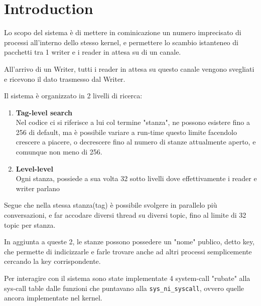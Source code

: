 \section{Introduction}

Lo scopo del sistema è di mettere in cominicazione un numero imprecisato di
processi all'interno dello stesso kernel, e permettere lo scambio istanteneo
di pacchetti tra 1 writer e i reader in attesa su di un canale.

All'arrivo di un Writer, tutti i reader in attesa su questo canale vengono
svegliati e ricevono il dato trasmesso dal Writer.

Il sistema è organizzato in 2 livelli di ricerca:
\begin{enumerate}
    \item \textbf{Tag-level search} \\
    Nel codice ci si riferisce a lui col termine "stanza", ne possono esistere fino a 256 di default,
    ma è possibile variare a run-time questo limite facendolo crescere a piacere, o decrescere fino al
    numero di stanze attualmente aperto, e comunque non meno di 256.
    \item \textbf{Level-level} \\
    Ogni stanza, possiede a sua volta 32 sotto livelli dove effettivamente i reader e writer parlano
\end{enumerate}

Segue che nella stessa stanza(tag) è possibile svolgere in parallelo più conversazioni, e far accodare
diversi thread su diversi topic, fino al limite di 32 topic per stanza.

In aggiunta a queste 2, le stanze possono possedere un "nome" publico, detto key, che permette di
indicizzarle e farle trovare anche ad altri processi semplicemente cercando la key corrispondente.

Per interagire con il sistema sono state implementate 4 system-call "rubate"
alla
sys-call table dalle funzioni che puntavano alla \verb|sys_ni_syscall|, ovvero quelle ancora implementate nel kernel.

